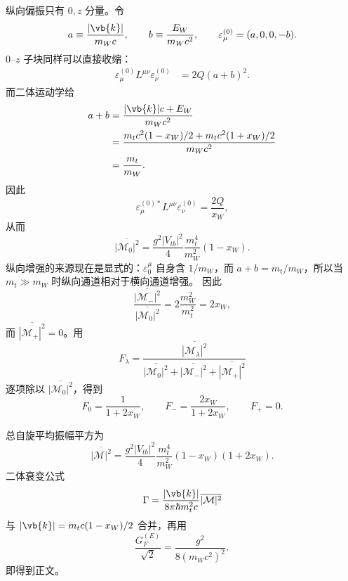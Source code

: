 \begin{derivation}[顶夸克衰变中的矢量螺旋度比例]
纵向偏振只有 $0,z$ 分量。令
\begin{equation*}
 a\equiv\frac{|\vb{k}|}{m_Wc},
 \qquad
 b\equiv\frac{E_W}{m_Wc^2},
 \qquad
 \varepsilon_{\mu}^{(0)}=(a,0,0,-b).
\end{equation*}
$0$--$z$ 子块同样可以直接收缩：
\begin{align*}
\varepsilon_{\mu}^{(0)}L^{\mu\nu}\varepsilon_{\nu}^{(0)}
&=2Q(a+b)^2.
\end{align*}
而二体运动学给
\begin{align*}
 a+b
&=\frac{|\vb{k}|c+E_W}{m_Wc^2}\\
&=\frac{m_tc^2(1-x_W)/2+m_tc^2(1+x_W)/2}{m_Wc^2}\\
&=\frac{m_t}{m_W}.
\end{align*}
因此
\begin{equation*}
\varepsilon_{\mu}^{(0)*}L^{\mu\nu}\varepsilon_{\nu}^{(0)}
=\frac{2Q}{x_W},
\end{equation*}
从而
\begin{equation*}
 {
 \overline{|\mathcal M_0|^2}
 =\frac{g^2|V_{tb}|^2}{4}
 \frac{m_t^4}{m_W^2}(1-x_W)}.
\end{equation*}
纵向增强的来源现在是显式的：$\varepsilon_0^\mu$ 自身含 $1/m_W$，而 $a+b=m_t/m_W$，所以当 $m_t\gg m_W$ 时纵向通道相对于横向通道增强。
因此
\begin{equation*}
 \frac{\overline{|\mathcal M_-|^2}}
 {\overline{|\mathcal M_0|^2}}
 =2\frac{m_W^2}{m_t^2}=2x_W,
\end{equation*}
而 $\overline{|\mathcal M_+|^2}=0$。用
\begin{equation*}
F_\lambda
=\frac{\overline{|\mathcal M_\lambda|^2}}
{\overline{|\mathcal M_0|^2}+\overline{|\mathcal M_-|^2}+\overline{|\mathcal M_+|^2}}
\end{equation*}
逐项除以 $\overline{|\mathcal M_0|^2}$，得到
\begin{equation*}
 F_0=\frac1{1+2x_W},
 \qquad
 F_-=\frac{2x_W}{1+2x_W},
 \qquad
 F_+=0.
\end{equation*}

总自旋平均振幅平方为
\begin{equation*}
 \overline{|\mathcal M|^2}
 =\frac{g^2|V_{tb}|^2}{4}
 \frac{m_t^4}{m_W^2}(1-x_W)(1+2x_W).
\end{equation*}
二体衰变公式
\begin{equation*}
 \Gamma
 =\frac{|\vb{k}|}{8\pi\hbar m_t^2c}
 \overline{|\mathcal M|^2}
\end{equation*}
与 $|\vb{k}|=m_tc(1-x_W)/2$ 合并，再用
\begin{equation*}
 \frac{G_F^{(E)}}{\sqrt2}=\frac{g^2}{8(m_Wc^2)^2},
\end{equation*}
即得到正文。
\end{derivation}


